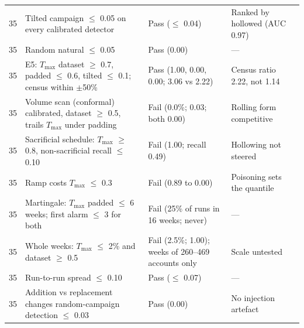 \begin{longtable}{p{}p{}p{}p{}}
35 & Tilted campaign $\le$ 0.05 on every calibrated detector & Pass ($\le$ 0.04) & Ranked by hollowed (AUC 0.97) \\
35 & Random natural $\le$ 0.05 & Pass (0.00) & --- \\
35 & E5: $T_{\max}$ dataset $\ge$ 0.7, padded $\le$ 0.6, tilted $\le$ 0.1; census within $\pm$50\% & Pass (1.00, 0.00, 0.00; 3.06 vs 2.22) & Census ratio 2.22, not 1.14 \\
35 & Volume scan (conformal) calibrated, dataset $\ge$ 0.5, trails $T_{\max}$ under padding & Fail (0.0\%; 0.03; both 0.00) & Rolling form competitive \\
35 & Sacrificial schedule: $T_{\max}$ $\ge$ 0.8, non-sacrificial recall $\le$ 0.10 & Fail (1.00; recall 0.49) & Hollowing not steered \\
35 & Ramp costs $T_{\max}$ $\le$ 0.3 & Fail (0.89 to 0.00) & Poisoning sets the quantile \\
35 & Martingale: $T_{\max}$ padded $\le$ 6 weeks; first alarm $\le$ 3 for both & Fail (25\% of runs in 16 weeks; never) & --- \\
35 & Whole weeks: $T_{\max}$ $\le$ 2\% and dataset $\ge$ 0.5 & Fail (2.5\%; 1.00); weeks of 260--469 accounts only & Scale untested \\
35 & Run-to-run spread $\le$ 0.10 & Pass ($\le$ 0.07) & --- \\
35 & Addition vs replacement changes random-campaign detection $\le$ 0.03 & Pass (0.00) & No injection artefact \\
\bottomrule
\end{longtable}
